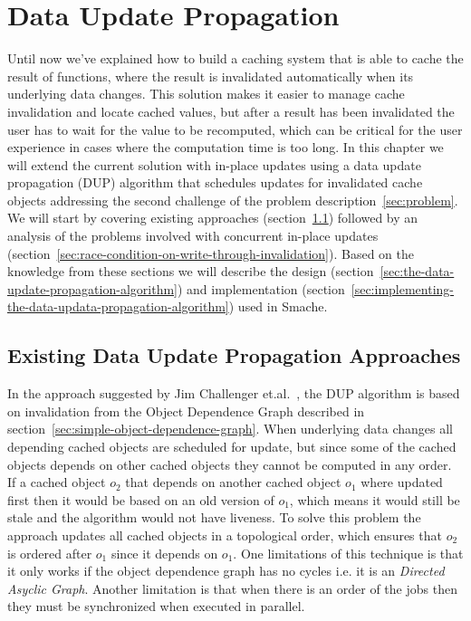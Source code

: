 \chapter{Data Update Propagation}
\label{chapter:data-update-propagation}

Until now we've explained how to build a caching system that is able to cache the result of functions, where the result is invalidated automatically when its underlying data changes. This solution makes it easier to manage cache invalidation and locate cached values, but after a result has been invalidated the user has to wait for the value to be recomputed, which can be critical for the user experience in cases where the computation time is too long.
In this chapter we will extend the current solution with in-place updates using a data update propagation (DUP) algorithm that schedules updates for invalidated cache objects addressing the second challenge of the problem description~\ref{sec:problem}. We will start by covering existing approaches (section~\ref{sec:existing-data-update-propagation-approaches}) followed by an analysis of the problems involved with concurrent in-place updates (section~\ref{sec:race-condition-on-write-through-invalidation}). Based on the knowledge from these sections we will describe the design (section~\ref{sec:the-data-update-propagation-algorithm}) and implementation (section~\ref{sec:implementing-the-data-updata-propagation-algorithm}) used in Smache.

\section{Existing Data Update Propagation Approaches}
\label{sec:existing-data-update-propagation-approaches}

In the approach suggested by Jim Challenger et.al.~\cite{paper:ibm, paper:ibm-extended, paper:ibm-publishing-system}, the DUP algorithm is based on invalidation from the Object Dependence Graph described in section~\ref{sec:simple-object-dependence-graph}. When underlying data changes all depending cached objects are scheduled for update, but since some of the cached objects depends on other cached objects they cannot be computed in any order. If a cached object $o_2$ that depends on another cached object $o_1$ where updated first then it would be based on an old version of $o_1$, which means it would still be stale and the algorithm would not have liveness. To solve this problem the approach updates all cached objects in a topological order, which ensures that $o_2$ is ordered after $o_1$ since it depends on $o_1$. One limitations of this technique is that it only works if the object dependence graph has no cycles i.e. it is an \emph{Directed Asyclic Graph}. Another limitation is that when there is an order of the jobs then they must be synchronized when executed in parallel.


